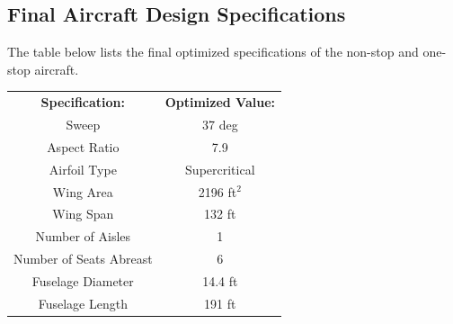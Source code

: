 \documentclass{article}
\begin{document}
    \subsection{Final Aircraft Design Specifications}
    \label{sec:optimized}

        \begin{flushleft}
            The table below lists the final optimized specifications of the
            non-stop and one-stop aircraft.
        \end{flushleft}

        \begin{table}[ht]
            \begin{tabular}{|c|c|}
                \hline
                \rowcolor[HTML]{FFC702}
                \multicolumn{2}{|c|}{\cellcolor[HTML]{FFC702}\textbf{Non-stop Aircraft}} \\ \hline
                \textbf{Specification:}            & \textbf{Optimized Value:}           \\ \hline
                Sweep                              & 37 deg                              \\ \hline
                \rowcolor[HTML]{C0C0C0}
                Aspect Ratio                       & 7.9                                 \\ \hline
                \rowcolor[HTML]{FFFFFF}
                Airfoil Type                       & Supercritical                       \\ \hline
                \rowcolor[HTML]{C0C0C0}
                Wing Area                          & 2196 ft$^2$                             \\ \hline
                \rowcolor[HTML]{FFFFFF}
                Wing Span                          & 132 ft                              \\ \hline
                \rowcolor[HTML]{C0C0C0}
                Number of Aisles                   & 1                                   \\ \hline
                \rowcolor[HTML]{FFFFFF}
                Number of Seats Abreast            & 6                                   \\ \hline
                \rowcolor[HTML]{C0C0C0}
                Fuselage Diameter                  & 14.4 ft                             \\ \hline
                \rowcolor[HTML]{FFFFFF}
                Fuselage Length                    & 191 ft                              \\ \hline

\end{tabular}
\end{table}
\end{document}
